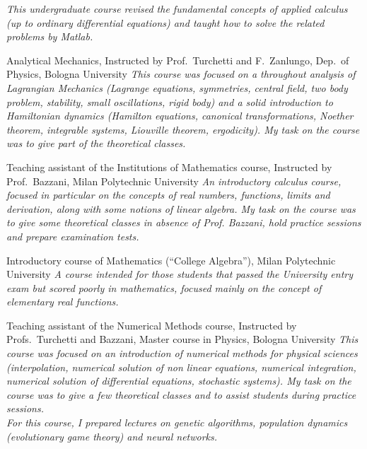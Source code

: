 \documentclass[helvetica,narrow,openbib,notitle,noflag, nologo]{europecv}
\begin{document}
\begin{europecv}
\ecvitem{} {\it This undergraduate course revised the fundamental concepts of applied calculus (up to ordinary differential equations) and 
taught how to solve the related problems by  Matlab.\\}

 {Analytical Mechanics, Instructed by Prof.~Turchetti and F.~Zanlungo, Dep.~of Physics, Bologna University}
\ecvitem{} {\it This course was focused on a throughout analysis of Lagrangian Mechanics (Lagrange equations, symmetries,
central field, two body problem, stability, small oscillations, rigid body) and a solid introduction to Hamiltonian dynamics (Hamilton equations, canonical  transformations, Noether theorem,
integrable systems, Liouville theorem, ergodicity). My task on the course was to give part of the theoretical classes.\\}

 {Teaching assistant of the Institutions of Mathematics course, Instructed by Prof.~Bazzani, Milan Polytechnic University}
\ecvitem{} {\it An introductory calculus course, focused in particular on the concepts of real numbers, functions, limits and derivation,
along with some notions of linear algebra. My task on the course was to give some theoretical classes in absence of Prof. Bazzani, hold practice sessions and prepare examination tests.\\}

 {Introductory course of Mathematics (``College Algebra''), Milan Polytechnic University}
\ecvitem{} {\it A course intended for those students that passed the University entry exam but scored poorly in
mathematics, focused mainly on the concept of elementary real functions.\\}

 {Teaching assistant of the Numerical Methods course, Instructed by Profs.~Turchetti and Bazzani, Master course in Physics, Bologna University}
\ecvitem{} {\it This course was focused on an introduction of 
numerical methods for physical sciences (interpolation, numerical solution of non linear
equations,
numerical integration, numerical solution of differential equations, stochastic systems). My task on the course was to give a few theoretical classes
and to assist students during practice sessions.\\}
\ecvitem{} {\it For this course, I prepared lectures on genetic algorithms, population dynamics (evolutionary game theory) and neural networks.\\}
\newpage
{}


\end{europecv}
\end{document}
